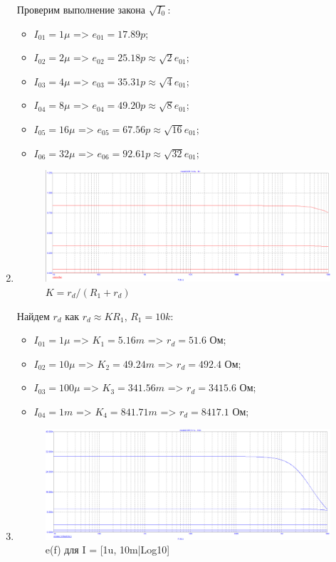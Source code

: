 \documentclass[a4paper, 12pt]{article}%
\begin{document}
\begin{enumerate}
Проверим выполнение закона $\sqrt{I_0}$:
\begin{itemize}
    \item $I_{01} = 1\mu$ => $e_{01} = 17.89p$;
    \item $I_{02} = 2\mu$ => $e_{02} = 25.18p \approx \sqrt{2}e_{01}$;
    \item $I_{03} = 4\mu$ => $e_{03} = 35.31p \approx \sqrt{4}e_{01}$; 
    \item $I_{04} = 8\mu$ => $e_{04} = 49.20p \approx \sqrt{8}e_{01}$;
    \item $I_{05} = 16\mu$ => $e_{05} = 67.56p \approx \sqrt{16}e_{01}$;
    \item $I_{06} = 32\mu$ => $e_{06} = 92.61p \approx \sqrt{32}e_{01}$;
\end{itemize}

\item


\begin{figure}[h!]
    \centering
    \includegraphics[scale=0.3]{images/mod2_2.png}
    \caption{$K = r_d/(R_1 + r_d)$}
    \label{fig:m212}
\end{figure}

Найдем $r_d$ как $r_d \approx K R_1$, $R_1 = 10k$:

\begin{itemize}
    \item $I_{01} = 1\mu$ => $K_{1} = 5.16m$ => $r_d = 51.6$ Ом;
    \item $I_{02} = 10\mu$ => $K_{2} = 49.24m$ => $r_d = 492.4$ Ом;
    \item $I_{03} = 100\mu$ => $K_{3} = 341.56m$ => $r_d = 3415.6$ Ом;
    \item $I_{04} = 1m$ => $K_{4} = 841.71m$ => $r_d = 8417.1$ Ом;
\end{itemize}

\item

\begin{figure}[h!]
    \centering
    \includegraphics[scale=0.3]{images/mod2_3.png}
    \caption{e(f) для I = [1u, 10m|Log10]}
    \label{fig:m23}
\end{figure}


\end{enumerate}
\end{document}
